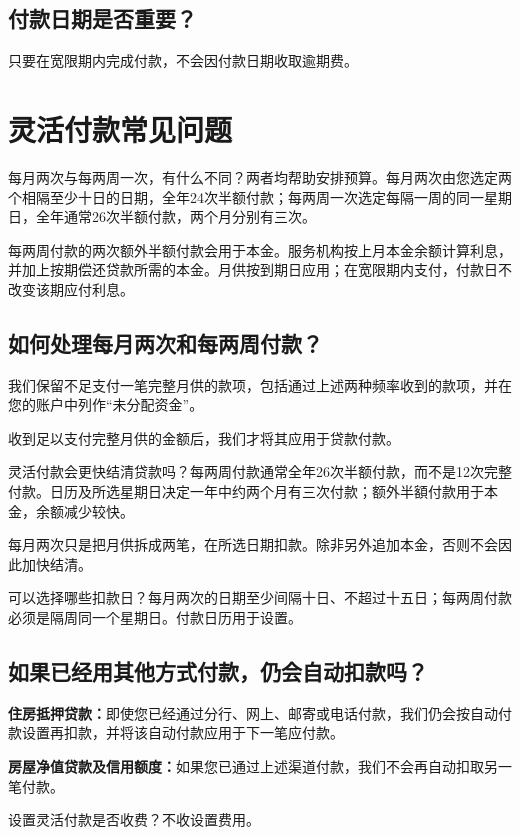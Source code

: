 \documentclass[UTF8,fontset=none,11pt,a4paper]{ctexart}
\begin{document}
\subsection*{付款日期是否重要？}
只要在宽限期内完成付款，不会因付款日期收\allowbreak\mbox{取逾期费。}


\section*{灵活付款常见问题}
每月两次与每两周一次，有什么不同？两者均帮助安排预算。每月两次由您选定两个相隔至少十日的日期，全年24次半额付款；每两周一次选定每隔一周的同一星期日，全年通常26次半额付款，两个月分\allowbreak\mbox{别有三次。}


每两周付款的两次额外半额付款会用于本金。服务机构按上月本金余额计算利息，并加上按期偿还贷款所需的本金。月供按到期日应用；在宽限期内支付，付款日不改变该期\allowbreak\mbox{应付利息。}


\subsection*{如何处理每月两次和每两周付款？}
我们保留不足支付一笔完整月供的款项，包括通过上述两种频率收到的款项，并在您的账户中列作“未\allowbreak\mbox{分配资金”。}


收到足以支付完整月供的金额后，我们才将其应用于\allowbreak\mbox{贷款付款。}


灵活付款会更快结清贷款吗？每两周付款通常全年26次半额付款，而不是12次完整付款。日历及所选星期日决定一年中约两个月有三次付款；额外半額付款用于本金，余额\allowbreak\mbox{减少较快。}


每月两次只是把月供拆成两笔，在所选日期扣款。除非另外追加本金，否则不会因此\allowbreak\mbox{加快结清。}


可以选择哪些扣款日？每月两次的日期至少间隔十日、不超过十五日；每两周付款必须是隔周同一个星期日。付款日历\allowbreak\mbox{用于设置。}


\subsection*{如果已经用其他方式付款，仍会自动扣款吗？}
\textbf{住房抵押贷款：}即使您已经通过分行、网上、邮寄或电话付款，我们仍会按自动付款设置再扣款，并将该自动付款应用于下一\allowbreak\mbox{笔应付款。}


\textbf{房屋净值贷款及信用额度：}如果您已通过上述渠道付款，我们不会再自动扣取另一\allowbreak\mbox{笔付款。}


设置灵活付款是否收费？不收\allowbreak\mbox{设置费用。}
\end{document}
